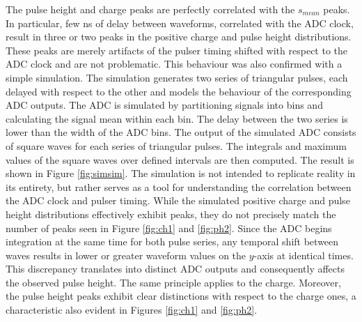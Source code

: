 The pulse height and charge peaks are perfectly 
correlated with the $s_{mean}$ peaks. 
In particular, few ns of delay between waveforms, 
correlated with the ADC clock, 
result in three or two peaks in the positive charge and 
pulse height distributions. 
These peaks are merely artifacts of the pulser 
timing shifted with respect to the ADC 
clock and are not problematic. This behaviour 
was also confirmed with a simple simulation.
The simulation generates two series of triangular 
pulses, each delayed with respect to the other 
and models the behaviour 
of the corresponding ADC outputs. The ADC is 
simulated by partitioning signals into bins and 
calculating the signal mean within each bin. 
The delay between the two series is lower 
than the width of the ADC bins. The output of 
the simulated ADC consists of square waves 
for each series of triangular pulses. The 
integrals and maximum values of the square 
waves over defined intervals are then computed.
The result is shown in Figure \ref{fig:simsim}. 
The simulation is not intended to replicate 
reality in its entirety, 
but rather serves as a tool for understanding 
the correlation between the ADC clock and pulser timing. 
While the simulated positive charge and pulse height 
distributions effectively exhibit peaks, they 
do not precisely 
match the number of peaks seen in Figure 
\ref{fig:ch1} and \ref{fig:ph2}. Since the 
ADC begins integration 
at the same time for both pulse series, any 
temporal shift between waves results in 
lower or greater waveform values on the 
$y$-axis at identical times. This discrepancy 
translates into distinct ADC outputs and
consequently affects the observed pulse height. 
The same principle applies to the charge. 
Moreover, the pulse height peaks exhibit 
clear distinctions with respect to the charge ones, 
a characteristic also evident in Figures 
\ref{fig:ch1} and \ref{fig:ph2}.
